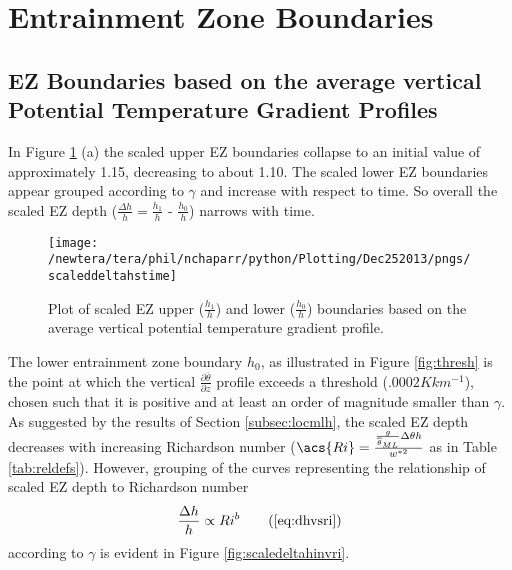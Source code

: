 
\section{Entrainment Zone Boundaries}
\label{sec:deltahri}
\FloatBarrier
\subsection{\acs{EZ} Boundaries based on the average vertical Potential Temperature Gradient Profiles}
In Figure \ref{fig:scaledEZlims} (a) the scaled upper \acs{EZ} boundaries collapse to an initial value of approximately 1.15, decreasing to about 1.10.  The scaled lower \acs{EZ} boundaries appear grouped according to $\gamma$ and increase with respect to time.  So overall the scaled \acs{EZ} depth ($\frac{\Delta h}{h} = \frac{h_{1}}{h}$ - $\frac{h_{0}}{h}$) narrows with time.\\

\begin{figure}[htbp]
    \centering
    \texttt{[image: /newtera/tera/phil/nchaparr/python/Plotting/Dec252013/pngs/scaleddeltahstime]}
    \caption[Plot of scaled \acs{EZ} upper ($\frac{h_{1}}{h}$) and lower ($\frac{h_{0}}{h}$) Boundaries]{Plot of scaled \acs{EZ} upper ($\frac{h_{1}}{h}$) and lower ($\frac{h_{0}}{h}$) boundaries based on the average vertical potential temperature gradient profile.}
    \label{fig:scaledEZlims}   %
\end{figure}

The lower entrainment zone boundary $h_{0}$, as illustrated in Figure \ref{fig:thresh} is the point at which the vertical 
$\frac{\partial \overline{\theta}}{\partial z}$ profile exceeds a threshold ($.0002K km^{-1}$), chosen such that
it is positive and at least an order of magnitude smaller than $\gamma$.   
As suggested by the results of Section \ref{subsec:locmlh}, the scaled \acs{EZ} depth decreases with increasing Richardson number ($\acs{Ri} = \frac{\frac{g}{\overline{\theta}_{ML}}\Delta \theta h}{w^{*2}}$ as in Table \ref{tab:reldefs}).  However, grouping of the curves representing the relationship of scaled \acs{EZ} depth to Richardson number
\begin{equation}
\frac{\Delta h}{h} \propto Ri ^{b} \tag{\ref{eq:dhvsri}}
\end{equation}
according to $\gamma$ is evident in Figure \ref{fig:scaledeltahinvri}.\\


